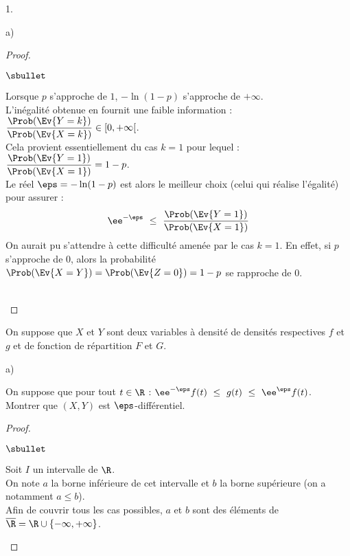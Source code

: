 \begin{noliste}{1.}
\begin{noliste}{a)}
\begin{proof}
\begin{noliste}{$\sbullet$}
      \item Lorsque $p$ s'approche de $1$, $-\ln(1-p)$ s'approche de
        $+\infty$.\\
        L'inégalité obtenue en  fournit une faible
        information : $\dfrac{\Prob(\Ev{Y= k})}{\Prob(\Ev{X = k})}
        \in [0, +\infty[$.\\[.2cm]
        Cela provient essentiellement du cas $k = 1$ pour lequel :
        $\dfrac{\Prob(\Ev{Y= 1})}{\Prob(\Ev{X = 1})} = 1 - p$.\\
        Le réel $\eps = -\ln(1-p)$ est alors le meilleur choix (celui
        qui réalise l'égalité) pour assurer :
        \[
        \ee^{-\eps} \ \leq \ \dfrac{\Prob(\Ev{Y= 1})}{\Prob(\Ev{X =
            1})}
        \]
        On aurait pu s'attendre à cette difficulté amenée par le cas
        $k = 1$. En effet, si $p$ s'approche de $0$, alors la
        probabilité $\Prob(\Ev{X = Y}) = \Prob(\Ev{Z = 0}) = 1-p$ se
        rapproche de $0$.
      \end{noliste}~\\[-1cm]
    \end{proof}
  \end{noliste}
  
\item On suppose que $X$ et $Y$ sont deux variables à densité de
  densités respectives $f$ et $g$ et de fonction de répartition $F$ et
  $G$.
  \begin{noliste}{a)}
    \setlength{\itemsep}{2mm} %
  \item On suppose que pour tout $t\in\R$ : $\ee^{-\eps} f(t) \ \leq \
    g(t) \ \leq \ \ee^{\eps}f(t)$.\\
    Montrer que $(X,Y)$ est $\eps$-différentiel.

    \begin{proof}~%
      \begin{noliste}{$\sbullet$}
      \item Soit $I$ un intervalle de $\R$.\\
        On note $a$ la borne inférieure de cet intervalle et $b$ la
        borne supérieure (on a notamment $a \leq b$).\\
        Afin de couvrir tous les cas possibles, $a$ et $b$ sont des
        éléments de $\overline{\R} = \R \cup \{-\infty, +\infty\}$.
        
        
        
        \newpage
        


\end{noliste}
\end{proof}
\end{noliste}
\end{noliste}

